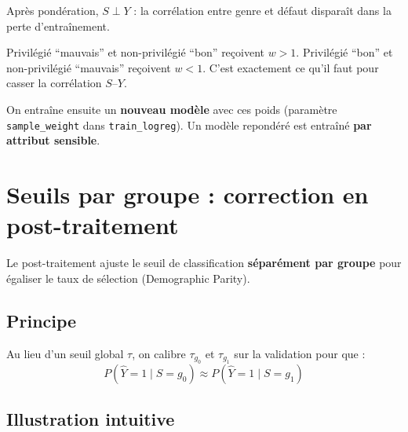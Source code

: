 \documentclass[11pt, a4paper]{article}
\begin{document}
\noindent Apr\`{e}s pond\'{e}ration, $S \perp Y$ : la corr\'{e}lation entre genre et d\'{e}faut dispara\^{i}t dans la perte d'entra\^{i}nement.

\begin{leconbox}
Privil\'{e}gi\'{e} ``mauvais'' et non-privil\'{e}gi\'{e} ``bon'' re\c{c}oivent $w > 1$. Privil\'{e}gi\'{e} ``bon'' et non-privil\'{e}gi\'{e} ``mauvais'' re\c{c}oivent $w < 1$. C'est exactement ce qu'il faut pour casser la corr\'{e}lation $S$--$Y$.
\end{leconbox}

On entra\^{i}ne ensuite un \textbf{nouveau mod\`{e}le} avec ces poids (param\`{e}tre \texttt{sample\_weight} dans \texttt{train\_logreg}). Un mod\`{e}le repondéré est entra\^{i}n\'{e} \textbf{par attribut sensible}.

\section{Seuils par groupe : correction en post-traitement}
\label{sec:postproc}

\begin{questionbox}
Le post-traitement ajuste le seuil de classification \textbf{s\'{e}par\'{e}ment par groupe} pour \'{e}galiser le taux de s\'{e}lection (Demographic Parity).
\end{questionbox}

\subsection{Principe}

Au lieu d'un seuil global $\tau$, on calibre $\tau_{g_0}$ et $\tau_{g_1}$ sur la validation pour que :
$$P(\hat{Y}{=}1 \mid S{=}g_0) \approx P(\hat{Y}{=}1 \mid S{=}g_1)$$

\subsection{Illustration intuitive}
\end{document}
